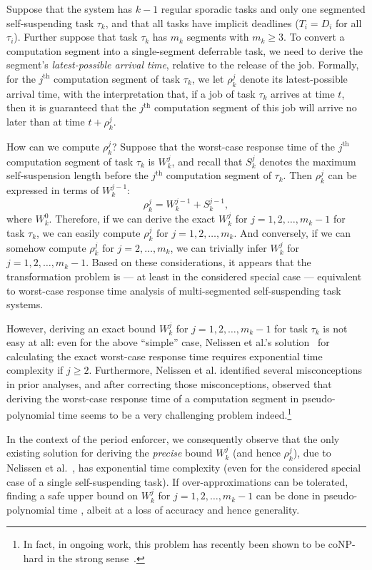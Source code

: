 Suppose that the system has $k-1$ regular sporadic tasks and only one segmented self-suspending task $\tau_k$, and that all tasks have implicit deadlines ($T_i = D_i$ for all $\tau_i$). Further suppose that task $\tau_k$ has $m_k$ segments with $m_k \geq 3$.  To  convert a computation segment into a single-segment deferrable task, we need to derive the segment's \emph{latest-possible arrival time}, relative to the release of the job. Formally,  for the $j^{\mathrm{th}}$ computation segment of task $\tau_k$, we let $\rho_k^j$ denote its latest-possible arrival time, with the interpretation that, if a job of task $\tau_k$ arrives at time $t$, then  it is guaranteed that the $j^{\mathrm{th}}$ computation segment of this job will arrive no later than at time $t+\rho_k^j$.

How can we compute $\rho_k^j$? Suppose that the worst-case response time of the $j^{\mathrm{th}}$ computation segment of task $\tau_k$ is $W_k^j$, and recall that $S_k^{j}$ denotes the maximum self-suspension length before the $j^{\mathrm{th}}$ computation segment of $\tau_k$. Then $\rho_k^j$ can be expressed in terms of $W_k^{j-1}$:
$$
	\rho_k^j = W_k^{j-1}+S_k^{j-1},
$$
where $W_k^0$.  Therefore, if we can derive the exact $W_k^j$ for $j=1,2,\ldots,m_k-1$ for task $\tau_k$, we can easily compute $\rho_k^j$  for $j=1,2,\ldots,m_k$. And conversely, if we can somehow compute $\rho_k^j$  for $j=2,\ldots,m_k$, we  can trivially infer $W_k^j$ for $j=1,2,\ldots,m_k-1$.
Based on these considerations, it appears that the transformation problem is  --- at least in the considered special case --- equivalent to worst-case response time analysis of multi-segmented self-suspending task systems. 

However, deriving an exact bound $W_k^j$ for $j=1,2,\ldots,m_k-1$ for task $\tau_k$ is not easy at all: 
even for the above ``simple'' case, Nelissen et al.'s solution~\cite{ecrts15nelissen} for calculating the exact worst-case response time requires exponential time complexity if $j \geq 2$. Furthermore, Nelissen et al. \cite{ecrts15nelissen} identified several misconceptions in prior analyses, and after correcting those misconceptions, observed that deriving the worst-case response time of a computation segment in pseudo-polynomial time seems to be a very challenging problem indeed.\footnote{In fact, in ongoing work, this problem has recently been shown to be coNP-hard in the strong sense~\cite{Chen2016b}.}

In the context of the period enforcer, we consequently observe that the only existing solution for deriving the \emph{precise} bound $W_k^{j}$ (and hence $\rho_k^j$), due to Nelissen et al.\ \cite{ecrts15nelissen},  has exponential time complexity (even for the considered special case of a single self-suspending task). If over-approximations can be tolerated, finding a safe upper bound on $W_k^j$ for $j=1,2,\ldots,m_k-1$ can be done in pseudo-polynomial time \cite{PH:rtss98,Huang:multiseg}, albeit at a loss of accuracy and hence generality. 


